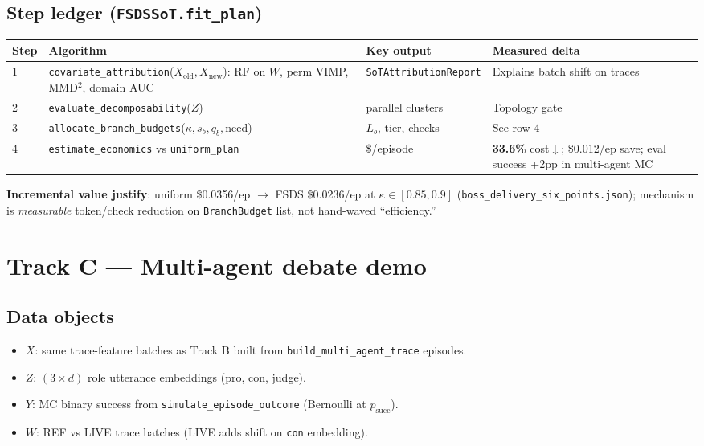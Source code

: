 \documentclass[11pt]{article}
\begin{document}
\subsection{Step ledger (\texttt{FSDSSoT.fit\_plan})}
\begin{center}
\small
\begin{tabular}{@{}llll@{}}
\toprule
Step & Algorithm & Key output & Measured delta \\
\midrule
1 & \texttt{covariate\_attribution}($X_{\mathrm{old}},X_{\mathrm{new}}$): RF on $W$, perm VIMP, MMD$^2$, domain AUC & \texttt{SoTAttributionReport} & Explains batch shift on traces \\
2 & \texttt{evaluate\_decomposability}($Z$) & parallel clusters & Topology gate \\
3 & \texttt{allocate\_branch\_budgets}($\kappa,s_b,q_b,\mathrm{need}$) & $L_b$, tier, checks & See row 4 \\
4 & \texttt{estimate\_economics} vs \texttt{uniform\_plan} & \$/episode & \textbf{33.6\%} cost$\downarrow$; \$0.012/ep save; eval success +2pp in multi-agent MC \\
\bottomrule
\end{tabular}
\end{center}

\textbf{Incremental value justify}: uniform \$0.0356/ep $\rightarrow$ FSDS \$0.0236/ep at $\kappa\in[0.85,0.9]$ (\texttt{boss\_delivery\_six\_points.json}); mechanism is \emph{measurable} token/check reduction on \texttt{BranchBudget} list, not hand-waved ``efficiency.''

\section{Track C --- Multi-agent debate demo}

\subsection{Data objects}
\begin{itemize}[nosep]
  \item \textbf{$X$}: same trace-feature batches as Track B built from \texttt{build\_multi\_agent\_trace} episodes.
  \item \textbf{$Z$}: $(3\times d)$ role utterance embeddings (pro, con, judge).
  \item \textbf{$Y$}: MC binary success from \texttt{simulate\_episode\_outcome} (Bernoulli at $p_{\mathrm{succ}}$).
  \item \textbf{$W$}: REF vs LIVE trace batches (LIVE adds shift on \texttt{con} embedding).
\end{itemize}
\end{document}
